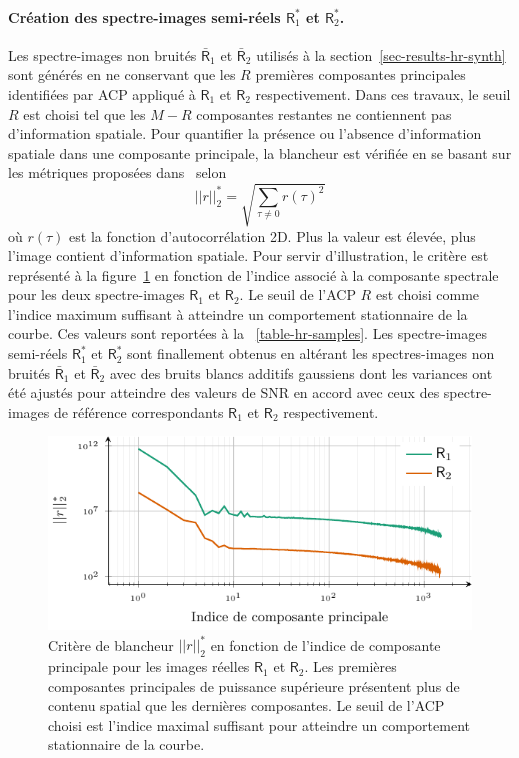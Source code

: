 \paragraph{Création des spectre-images semi-réels $\mathsf{R}_1^*$ et $\mathsf{R}_2^*$.} Les spectre-images non bruités $\bar{\mathsf{R}}_1$ et $\bar{\mathsf{R}}_2$ utilisés à la section~\ref{sec-results-hr-synth} sont générés en ne conservant que les $R$ premières composantes principales identifiées par ACP appliqué à $\mathsf{R}_1$ et $\mathsf{R}_2$ respectivement. Dans ces travaux, le seuil $R$ est choisi tel que les $M-R$ composantes restantes ne contiennent pas d'information spatiale. Pour quantifier la présence ou l'absence d'information spatiale dans une composante principale, la blancheur est vérifiée en se basant sur les métriques proposées dans~\cite[chap. 3]{riot2018residual} selon
\begin{equation}
    ||r||_2^* = \sqrt{\sum_{\tau\neq 0} r(\tau)^2}
\end{equation}
où $r(\tau)$ est la fonction d'autocorrélation 2D. Plus la valeur est élevée, plus l'image contient d'information spatiale. Pour servir d'illustration, le critère est représenté à la figure~\ref{fig-whiteness-metric} en fonction de l'indice associé à la composante spectrale pour les deux spectre-images $\mathsf{R}_1$ et $\mathsf{R}_2$. Le seuil de l'ACP $R$ est choisi comme l'indice maximum suffisant à atteindre un comportement stationnaire de la courbe. Ces valeurs sont reportées à la \tabname~\ref{table-hr-samples}. Les spectre-images semi-réels $\mathsf{R}_1^*$ et $\mathsf{R}_2^*$ sont finallement obtenus en altérant les spectres-images non bruités $\bar{\mathsf{R}}_1$ et $\bar{\mathsf{R}}_2$ avec des bruits blancs additifs gaussiens dont les variances ont été ajustés pour atteindre des valeurs de SNR en accord avec ceux des spectre-images de référence correspondants $\mathsf{R}_1$ et $\mathsf{R}_2$ respectivement.

\begin{figure}[]
    \centering
    \includegraphics{img/chapitre4/figure17/remaining_structure.pdf}
    \caption{Critère de blancheur  $||r||_2^*$ en fonction de l'indice de composante principale pour les images réelles $\mathsf{R}_1$ et $\mathsf{R}_2$. Les premières composantes principales de puissance supérieure présentent plus de contenu spatial que les dernières composantes. Le seuil de l'ACP choisi est l'indice maximal suffisant pour atteindre un comportement stationnaire de la courbe.
        \protect\label{fig-whiteness-metric}}
\end{figure}



